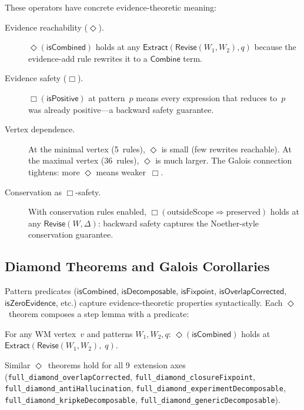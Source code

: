 \documentclass[11pt,openany]{report}
\begin{document}
These operators have concrete evidence-theoretic meaning:

\begin{description}
\item[Evidence reachability ($\Diamond$).]
  $\Diamond(\mathsf{isCombined})$ holds at any
  $\mathsf{Extract}(\mathsf{Revise}(W_1, W_2), q)$ because the
  evidence-add rule rewrites it to a $\mathsf{Combine}$ term.

\item[Evidence safety ($\Box$).]
  $\Box(\mathsf{isPositive})$ at pattern~$p$ means every expression that
  reduces to~$p$ was already positive---a backward safety guarantee.

\item[Vertex dependence.]
  At the minimal vertex (5~rules), $\Diamond$ is small (few rewrites
  reachable).  At the maximal vertex (36~rules), $\Diamond$ is much
  larger.  The Galois connection tightens:
  more $\Diamond$ means weaker~$\Box$.

\item[Conservation as $\Box$-safety.]
  With conservation rules enabled, $\Box(\text{outsideScope} \Rightarrow
  \text{preserved})$ holds at any $\mathsf{Revise}(W, \Delta)$: backward
  safety captures the Noether-style conservation guarantee.
\end{description}

\subsection{Diamond Theorems and Galois Corollaries}

Pattern predicates ($\mathsf{isCombined}$, $\mathsf{isDecomposable}$,
$\mathsf{isFixpoint}$, $\mathsf{isOverlapCorrected}$,
$\mathsf{isZeroEvidence}$, etc.) capture evidence-theoretic properties
syntactically.  Each $\Diamond$~theorem composes a step lemma with a
predicate:

\begin{theorem}
For any WM vertex~$v$ and patterns $W_1, W_2, q$:
$\Diamond(\mathsf{isCombined})$ holds at
$\mathsf{Extract}(\mathsf{Revise}(W_1, W_2),\; q)$.
\end{theorem}

\noindent
Similar $\Diamond$~theorems hold for all 9~extension axes
(\texttt{full\_diamond\_overlapCorrected},
\texttt{full\_diamond\_closureFixpoint},
\texttt{full\_diamond\_antiHallucination},
\texttt{full\_diamond\_experimentDecomposable},
\texttt{full\_diamond\_kripkeDecomposable},
\texttt{full\_diamond\_genericDecomposable}).
\end{document}
